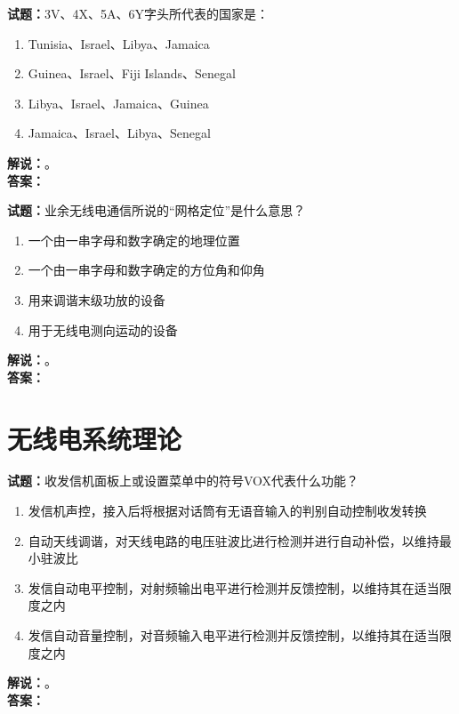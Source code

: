 \documentclass{ctexbook}
\begin{document}
\bigskip

\noindent\textbf{试题：}3V、4X、5A、6Y字头所代表的国家是：
\begin{enumerate}[leftmargin=3em]
  \item Tunisia、Israel、Libya、Jamaica %
  \item Guinea、Israel、Fiji Islands、Senegal
  \item Libya、Israel、Jamaica、Guinea
  \item Jamaica、Israel、Libya、Senegal
\end{enumerate}
\noindent\textbf{解说：}\textbf{}。\\\noindent\textbf{答案：}

\bigskip

\noindent\textbf{试题：}业余无线电通信所说的“网格定位”是什么意思？
\begin{enumerate}[leftmargin=3em]
  \item 一个由一串字母和数字确定的地理位置 %
  \item 一个由一串字母和数字确定的方位角和仰角
  \item 用来调谐末级功放的设备
  \item 用于无线电测向运动的设备
\end{enumerate}
\noindent\textbf{解说：}\textbf{}。\\\noindent\textbf{答案：}

\bigskip



\chapter{无线电系统理论}

\newpage

\noindent\textbf{试题：}收发信机面板上或设置菜单中的符号VOX代表什么功能？
\begin{enumerate}[leftmargin=3em]
  \item 发信机声控，接入后将根据对话筒有无语音输入的判别自动控制收发转换
  \item 自动天线调谐，对天线电路的电压驻波比进行检测并进行自动补偿，以维持最小驻波比
  \item 发信自动电平控制，对射频输出电平进行检测并反馈控制，以维持其在适当限度之内
  \item 发信自动音量控制，对音频输入电平进行检测并反馈控制，以维持其在适当限度之内
\end{enumerate}
\noindent\textbf{解说：}\textbf{}。\\\noindent\textbf{答案：}
\end{document}
